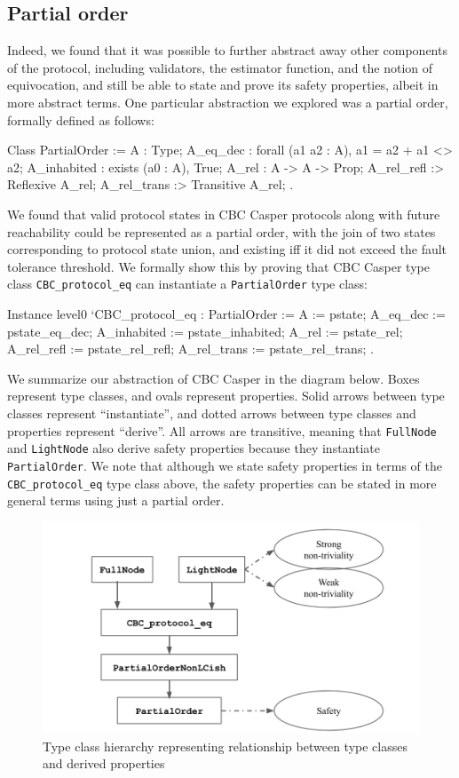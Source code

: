 \documentclass[runningheads]{llncs}
\begin{document}
\subsection{Partial order}
 Indeed, we found that it was possible to further abstract away other components of the protocol, including validators, the estimator function, and the notion of equivocation, and still be able to state and prove its safety properties, albeit in more abstract terms. One particular abstraction we explored was a partial order, formally defined as follows: 
\begin{coq} 
Class PartialOrder :=
	{ A : Type;
		A_eq_dec : forall (a1 a2 : A), {a1 = a2} + {a1 <> a2};
		A_inhabited : exists (a0 : A), True; 
		A_rel : A -> A -> Prop;
		A_rel_refl :> Reflexive A_rel;
		A_rel_trans :> Transitive A_rel;
	}.
\end{coq} 	
We found that valid protocol states in CBC Casper protocols along with future reachability could be represented as a partial order, with the join of two states corresponding to protocol state union, and existing iff it did not exceed the fault tolerance threshold. We formally show this by proving that CBC Casper type class \verb|CBC_protocol_eq| can instantiate a \verb|PartialOrder| type class: 
\begin{coq}
Instance level0 `{CBC_protocol_eq} : PartialOrder :=
	{ A := pstate;
		A_eq_dec := pstate_eq_dec;
		A_inhabited := pstate_inhabited;
		A_rel := pstate_rel;
		A_rel_refl := pstate_rel_refl;
		A_rel_trans := pstate_rel_trans;
	}.
\end{coq}
We summarize our abstraction of CBC Casper in the diagram below. Boxes represent type classes, and ovals represent properties. Solid arrows between type classes represent ``instantiate'', and dotted arrows between type classes and properties represent ``derive''. All arrows are transitive, meaning that \verb|FullNode| and \verb|LightNode| also derive safety properties because they instantiate \verb|PartialOrder|. We note that although we state safety properties in terms of the \verb|CBC_protocol_eq| type class above, the safety properties can be stated in more general terms using just a partial order.
\begin{figure}
	\centering
	\includegraphics[scale = 0.2]{Flowchart.png}
	\caption{Type class hierarchy representing relationship between type classes and derived properties}
	\label{fig:flowchart}
\end{figure}
\end{document}
